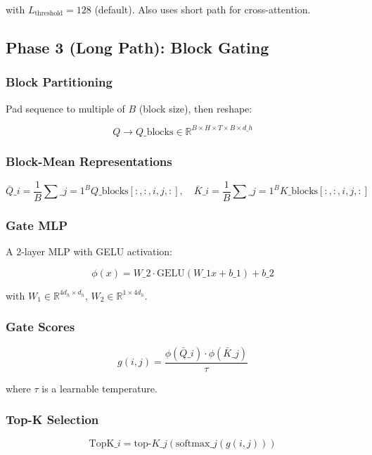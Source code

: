 with $L_\text{threshold} = 128$ (default). Also uses short path for 
cross-attention.

\subsection{Phase 3 (Long Path): Block Gating}

\subsubsection{Block Partitioning}

Pad sequence to multiple of $B$ (block size), then reshape:

\[
Q \to Q\_\text{blocks} \in \mathbb{R}^{B \times H \times T \times B \times d\_h}
\tag{4.3}
\]

\subsubsection{Block-Mean Representations}

\[
\bar{Q}\_i = \frac{1}{B} \sum\_{j=1}^{B} Q\_\text{blocks}[:, :, i, j, :], \quad
\bar{K}\_i = \frac{1}{B} \sum\_{j=1}^{B} K\_\text{blocks}[:, :, i, j, :]
\tag{4.4}
\]

\subsubsection{Gate MLP}

A 2-layer MLP with GELU activation:

\[
\phi(x) = W\_2 \cdot \text{GELU}(W\_1 x + b\_1) + b\_2
\tag{4.5}
\]

with $W_1 \in \mathbb{R}^{4 d_h \times d_h}$, $W_2 \in \mathbb{R}^{1 \times 4 d_h}$.

\subsubsection{Gate Scores}

\[
g(i, j) = \frac{\phi(\bar{Q}\_i) \cdot \phi(\bar{K}\_j)}{\tau}
\tag{4.6}
\]

where $\tau$ is a learnable temperature.

\subsubsection{Top-K Selection}

\[
\text{TopK}\_i = \text{top-}K\_{j}(\text{softmax}\_j(g(i, j)))
\tag{4.7}
\]

